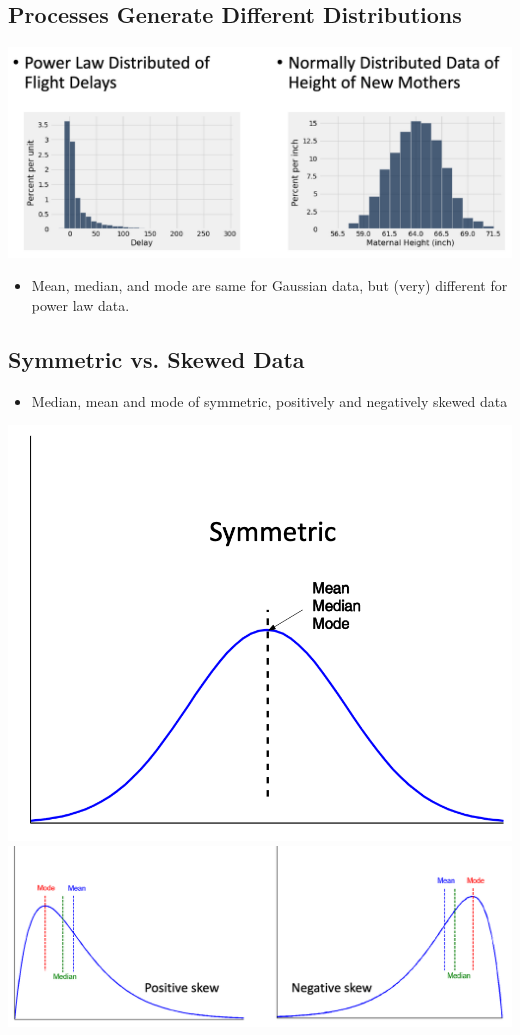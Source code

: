 \documentclass[11pt]{article}
\theoremstyle{definition}
\begin{document}
\subsection{Processes Generate Different Distributions}
\includegraphics[width=\textwidth]{11.png}
\begin{itemize}
    \item Mean, median, and mode are same for Gaussian data, but (very) different for power law data.
\end{itemize}
\subsection{Symmetric vs. Skewed Data}
\begin{itemize}
    \item Median, mean and mode of symmetric,
    positively and negatively skewed data
\end{itemize}
\includegraphics[width=\textwidth/4]{12.png}
\includegraphics[width=\textwidth]{13.png}
\end{document}
